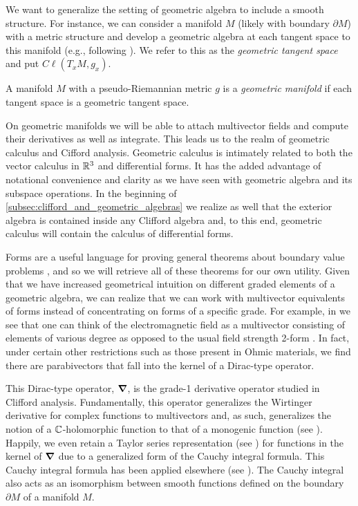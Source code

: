 We want to generalize the setting of geometric algebra to include a smooth structure. For instance, we can consider a manifold $M$ (likely with boundary $\partial M$) with a metric structure and develop a geometric algebra at each tangent space to this manifold (e.g., following \cite{schindler_geometric_2020}). We refer to this as the \emph{geometric tangent space} and put $C\ell(T_xM,g_x)$.
\begin{definition}
A manifold $M$ with a pseudo-Riemannian metric $g$ is a \emph{geometric manifold} if each tangent space is a geometric tangent space.
\end{definition}
On geometric manifolds we will be able to attach multivector fields and compute their derivatives as well as integrate. This leads us to the realm of geometric calculus and Cifford analysis. Geometric calculus is intimately related to both the vector calculus in $\mathbb{R}^3$ and differential forms. It has the added advantage of notational convenience and clarity as we have seen with geometric algebra and its subspace operations. In the beginning of \cref{subsec:clifford_and_geometric_algebras} we realize as well that the exterior algebra is contained inside any Clifford algebra and, to this end, geometric calculus will contain the calculus of differential forms. 

Forms are a useful language for proving general theorems about boundary value problems \cite{schwarz_hodge_1995}, and so we will retrieve all of these theorems for our own utility. Given that we have increased geometrical intuition on different graded elements of a geometric algebra, we can realize that we can work with multivector equivalents of forms instead of concentrating on forms of a specific grade. For example, in  we see that one can think of the electromagnetic field as a multivector consisting of elements of various degree as opposed to the usual field strength 2-form . In fact, under certain other restrictions such as those present in Ohmic materials, we find there are parabivectors that fall into the kernel of a Dirac-type operator.

This Dirac-type operator, $\boldsymbol{\nabla}$, is the grade-1 derivative operator studied in Clifford analysis. Fundamentally, this operator generalizes the Wirtinger derivative for complex functions to multivectors and, as such, generalizes the notion of a $\mathbb{C}$-holomorphic function to that of a monogenic function (see ). Happily, we even retain a Taylor series representation (see ) for functions in the kernel of $\boldsymbol{\nabla}$ due to a generalized form of the Cauchy integral formula. This Cauchy integral formula has been applied elsewhere (see \cite{brackx_hilbert_2008}). The Cauchy integral also acts as an isomorphism between smooth functions defined on the boundary $\partial M$ of a manifold $M$. 

